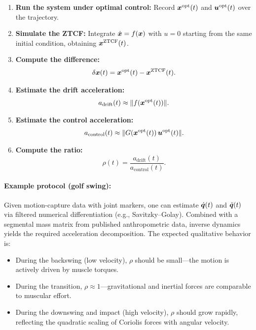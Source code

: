 \begin{enumerate}
\item \textbf{Run the system under optimal control:} Record $\bm{x}^{\text{opt}}(t)$ and
$\bm{u}^{\text{opt}}(t)$ over the trajectory.

\item \textbf{Simulate the ZTCF:} Integrate $\dot{\bm{x}} = f(\bm{x})$ with $u = 0$ starting from
the same initial condition, obtaining $\bm{x}^{\text{ZTCF}}(t)$.

\item \textbf{Compute the difference:}
\begin{equation}
\delta\bm{x}(t) = \bm{x}^{\text{opt}}(t) - \bm{x}^{\text{ZTCF}}(t).
\end{equation}

\item \textbf{Estimate the drift acceleration:}
\begin{equation}
a_{\text{drift}}(t) \approx \|f(\bm{x}^{\text{opt}}(t))\|.
\end{equation}

\item \textbf{Estimate the control acceleration:}
\begin{equation}
a_{\text{control}}(t) \approx \|G(\bm{x}^{\text{opt}}(t))\,\bm{u}^{\text{opt}}(t)\|.
\end{equation}

\item \textbf{Compute the ratio:}
\begin{equation}
\rho(t) = \frac{a_{\text{drift}}(t)}{a_{\text{control}}(t)}.
\end{equation}
\end{enumerate}

\paragraph{Example protocol (golf swing):}
Given motion-capture data with joint markers, one can estimate $\dot{\bm{q}}(t)$ and $\ddot{\bm{q}}(t)$
via filtered numerical differentiation (e.g., Savitzky--Golay). Combined with a segmental
mass matrix from published anthropometric data, inverse dynamics yields the required
acceleration decomposition. The expected qualitative behavior is:

\begin{itemize}
\item During the backswing (low velocity), $\rho$ should be small---the motion is
      actively driven by muscle torques.
\item During the transition, $\rho \approx 1$---gravitational and inertial forces
      are comparable to muscular effort.
\item During the downswing and impact (high velocity), $\rho$ should grow rapidly,
      reflecting the quadratic scaling of Coriolis forces with angular velocity.
\end{itemize}

